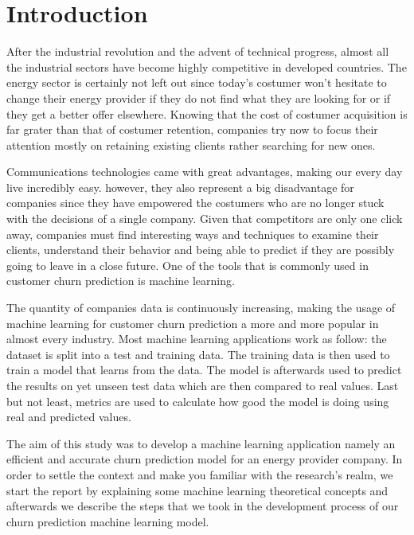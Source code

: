 \documentclass[LaM,binding=0.6cm, english]{sapthesis}
\begin{document}
\printnoidxglossaries

\listoffigures

\listoftables

\mainmatter

\chapter{Introduction}

\par After the industrial revolution and the advent of technical progress, almost all the industrial sectors have become highly competitive in developed countries. The energy sector is certainly not left out since today's costumer won't hesitate to change their energy provider if they do not find what they are looking for or if they get a better offer elsewhere. Knowing that the cost of costumer acquisition is far grater than that of costumer retention, companies try now to focus their attention mostly on retaining existing clients rather searching for new ones.

\par Communications technologies came with great advantages, making our every day live incredibly easy. however, they also represent a big disadvantage for companies since they have empowered the costumers who are no longer stuck with the decisions of a single company. Given that competitors are only one click away, companies must find interesting ways and techniques to examine their clients, understand their behavior and being able to predict if they are possibly going to leave in a close future. One of the tools that is commonly used in customer churn prediction is machine learning.

\par The quantity of companies data is continuously increasing, making the usage of machine learning for customer churn prediction a more and more popular in almost every industry. Most machine learning applications work as follow: the dataset is split into a test and training data. The training data is then used to train a model that learns from the data. The model is afterwards used to predict the results on yet unseen test data which are then compared to real values. Last but not least, metrics are used to calculate how good the model is doing using real and predicted values.\cite{Geron2017}

\par The aim of this study was to develop a machine learning application namely an efficient and accurate churn prediction model for an energy provider company. In order to settle the context and make you familiar with the research's realm, we start the report by explaining some machine learning theoretical concepts and afterwards we describe the steps that we took in the development process of our churn prediction machine learning model.
\end{document}
